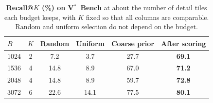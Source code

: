 \begin{table}[t]
  \centering
  \footnotesize
  \setlength{\tabcolsep}{4pt}
  \begin{tabular}{lc cc cc}
    \toprule
    $B$ & $K$ & Random & Uniform & Coarse prior & After scoring \\
    \midrule
    1024 & 2 & 7.2 & 3.7 & 27.7 & \textbf{69.1} \\
    1536 & 4 & 14.8 & 8.9 & 67.0 & \textbf{71.2} \\
    2048 & 4 & 14.8 & 8.9 & 59.7 & \textbf{72.8} \\
    3072 & 6 & 22.6 & 14.1 & 77.5 & \textbf{80.1} \\
    \bottomrule
  \end{tabular}
  \caption{\textbf{Recall@$K$ (\%) on V$^*$~Bench} at about the number of detail tiles each budget keeps, with $K$ fixed so that all columns are comparable. Random and uniform selection do not depend on the budget.}
  \label{tab:recall}
\end{table}
